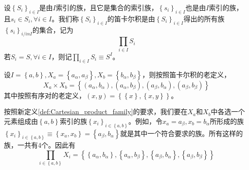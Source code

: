 \documentclass[../main.tex]{subfiles}
\begin{document}
\begin{definition}[笛卡尔积]\label{def:Cartesian_product_family}
    设$\left\{S_i\right\}_{i\in I}$是由$I$索引的族，且它是集合的索引族，$\left\{s_i\right\}_{i\in I}$也是由$I$索引的族，且$s_i\in S_i,\forall i\in I$。我们称$\left\{S_i\right\}_{i\in I}$的笛卡尔积是由$\left\{S_i\right\}_{i\in I}$得出的所有族$\left\{s_i\right\}_{i/in I}$的集合，记为
    \[
        \prod_{i\in I}S_i
    \]
    若$S_i=S,\forall i\in I$，则记$\prod_{i\in I}S_i\equiv S^I$。
\end{definition}
\begin{example}
    设$I=\left\{a,b\right\},X_a=\left\{a_\alpha,a_\beta\right\},X_b=\left\{b_\alpha,b_\beta\right\}$，则按照笛卡尔积的老定义，
    \[
        X_a\times X_b=\left\{\left(a_\alpha,b_\alpha\right),\left(a_\alpha,b_\beta\right),\left(a_\beta,b_\alpha\right),\left(a_\beta,b_\beta\right)\right\}
    \]
    其中按照有序对的老定义，$\left(x,y\right)=\left\{\left\{x\right\},\left\{x,y\right\}\right\}$。

    按照新定义\ref{def:Cartesian_product_family}的要求，我们要在$X_a$和$X_b$中各选一个元素组成由$\left\{a,b\right\}$索引的族$\left\{x_i\right\}_{i\in\left\{a,b\right\}}$。例如，令$x_a=a_\beta,x_b=b_\alpha$所形成的族$\left\{x_i\right\}_{i\in\left\{a,b\right\}}\equiv\left\{x_a,x_b\right\}=\left\{a_\beta,b_\alpha\right\}$就是其中一个符合要求的族。所有这样的族，一共有4个。因此有
    \[
        \prod_{i\in\left\{a,b\right\}}X_i=\left\{\left\{a_\alpha,b_\alpha\right\},\left\{a_\alpha,b_\beta\right\},\left\{a_\beta,b_\alpha\right\},\left\{a_\beta,b_\beta\right\}\right\}
    \]
\end{example}
\end{document}
